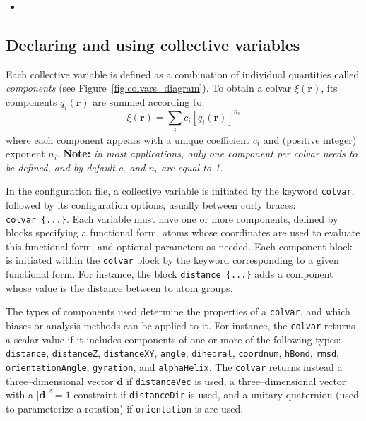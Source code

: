 \begin{itemize}
\item %

\end{itemize}



\subsection{Declaring and using collective variables}
\label{sec:colvar}

Each collective variable is defined as a combination of
individual quantities called \emph{components}
(see Figure~\ref{fig:colvars_diagram}). To obtain a colvar $\xi(\mathbf{r})$,
its components $q_i(\mathbf{r})$ are summed according to:
\begin{equation}
  \label{eq:colvar_combination}
  \xi(\mathbf{r}) = \sum_i c_i [q_i(\mathbf{r})]^{n_i}
\end{equation}
where each component appears with a unique coefficient $c_i$ and
(positive integer) exponent $n_i$.  \textbf{Note:} \emph{in most
  applications, only one component per colvar needs to be defined, and
  by default $c_i$ and $n_i$ are equal to 1.}

In the configuration file, a collective variable is initiated
by the keyword \texttt{colvar},
followed by its configuration options, usually between curly braces:
\texttt{colvar~\{...\}}. Each variable must
have one or more components, defined by blocks specifying a
functional form, atoms whose coordinates are used to evaluate
this functional form, and optional parameters as needed. Each
component block is initiated within the \texttt{colvar} block by the
keyword corresponding to a given functional form.  For instance, the
block \texttt{distance \{...\}} adds a component whose value is
the distance between to atom groups.

The types of components used determine the properties of a
\texttt{colvar}, and which biases or analysis methods can be applied
to it.  For instance, the \texttt{colvar} returns a scalar value if it
includes components of one or more of the following types:
\texttt{distance}, \texttt{distanceZ}, \texttt{distanceXY},
\texttt{angle}, \texttt{dihedral}, \texttt{coordnum}, \texttt{hBond},
\texttt{rmsd}, \texttt{orientationAngle}, \texttt{gyration}, and
\texttt{alphaHelix}.  The \texttt{colvar} returns instead a
three--dimensional vector $\mathbf{d}$ if \texttt{distanceVec} is
used, a three--dimensional vector with a $|\mathbf{d}|^2 = 1$
constraint if \texttt{distanceDir} is used, and a unitary quaternion
(used to parameterize a rotation) if \texttt{orientation} is are used.


